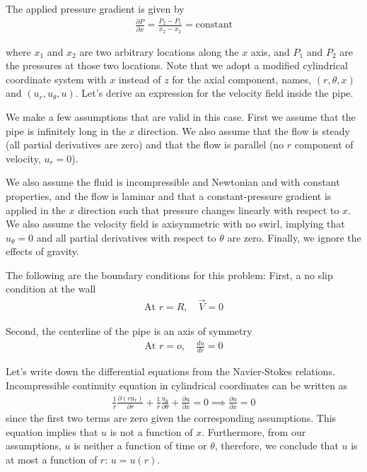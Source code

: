 \documentclass[book.tex]{subfiles}
\begin{document}
The applied pressure gradient is given by 
\begin{align}
\frac{\partial P}{\partial x}=\frac{P_2-P_1}{x_2-x_2}= \textrm{constant}
\end{align}

where $x_1$ and $x_2$ are two arbitrary locations along the $x$ axis, and $P_1$ and $P_2$ are the pressures at those two locations. Note that we adopt a modified cylindrical coordinate system with $x$ instead of $z$ for the axial component, names, $(r,\theta, x)$ and $(u_r, u_{\theta},u)$. Let's derive an expression for the velocity field inside the pipe.

We make a few assumptions that are valid in this case. First we assume that the pipe is infinitely long in the $x$ direction. We also assume that the flow is steady (all partial derivatives are zero) and that the flow is parallel (no $r$ component of velocity, $u_r=0$).

We also assume the fluid is incompressible and Newtonian and with constant properties, and the flow is laminar and that a constant-pressure gradient is applied in the $x$ direction such that pressure changes linearly with respect to $x$. We also assume the velocity field is axisymmetric with no swirl, implying that $u_{\theta}=0$ and all partial derivatives with respect to $\theta$ are zero. Finally, we ignore the effects of gravity.

The following are the boundary conditions for this problem: First, a no slip condition at the wall
\begin{align}
\textrm{At }r=R, \quad \vec{V}=0
\end{align}

Second, the centerline of the pipe is an axis of symmetry
\begin{align}
\textrm{At }r=o, \quad \frac{du}{dr}=0
\end{align}

Let's write down the differential equations from the Navier-Stokes relations. Incompressible continuity equation in cylindrical coordinates can be written as
\begin{align}
    \frac{1}{r}\frac{\partial(r u_r)}{\partial r}+\frac{1}{r}\frac{u_{\theta}}{\partial \theta}+\frac{\partial u}{\partial x}=0 \implies \frac{\partial u}{\partial x}=0
\end{align}
since the first two terms are zero given the corresponding assumptions. This equation implies that $u$ is not a function of $x$. Furthermore, from our assumptions, $u$ is neither a function of time or $\theta$, therefore, we conclude that $u$ is at most a function of $r$: $u=u(r)$.
\end{document}
